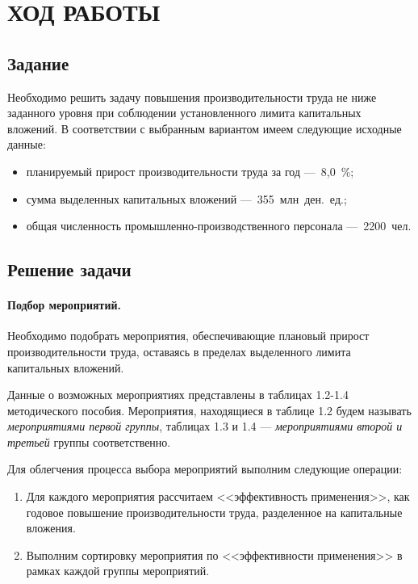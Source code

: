 \section{ХОД РАБОТЫ}

\subsection{Задание}

Необходимо решить задачу повышения производительности труда не ниже заданного уровня
при соблюдении установленного лимита капитальных вложений. В соответствии с выбранным вариантом
имеем следующие исходные данные:

\begin{itemize}
  \item планируемый прирост производительности труда за год ---~8,0~\%;
  \item сумма выделенных капитальных вложений ---~355~млн~ден.~ед.;
  \item общая численность промышленно-производственного персонала ---~2200~чел.
\end{itemize}

\subsection{Решение задачи}

\paragraph{Подбор мероприятий.}

Необходимо подобрать мероприятия, обеспечивающие плановый прирост производительности
труда, оставаясь в пределах выделенного лимита капитальных вложений.

Данные о возможных мероприятиях представлены в таблицах 1.2-1.4 методического пособия.
Мероприятия, находящиеся в таблице 1.2 будем называть \textit{мероприятиями первой группы}, 
таблицах 1.3 и 1.4 --- \textit{мероприятиями второй и третьей} группы соответственно.

Для облегчения процесса выбора мероприятий выполним следующие операции:

\begin{enumerate}
  \item Для каждого мероприятия рассчитаем <<эффективность применения>>,
    как годовое повышение производительности труда, разделенное на капитальные вложения.
  \item Выполним сортировку мероприятия по <<эффективности применения>> в рамках каждой
    группы мероприятий.
\end{enumerate}


